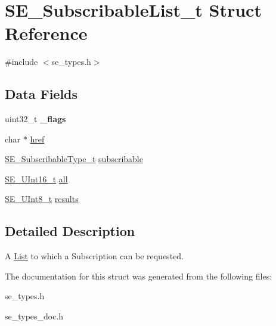 \hypertarget{structSE__SubscribableList__t}{}\section{S\+E\+\_\+\+Subscribable\+List\+\_\+t Struct Reference}
\label{structSE__SubscribableList__t}


{\ttfamily \#include $<$se\+\_\+types.\+h$>$}

\subsection*{Data Fields}
\begin{DoxyCompactItemize}
\item 
uint32\+\_\+t {\bfseries \+\_\+flags}
\item 
char $\ast$ \hyperlink{group__SubscribableList_gae6a8fd9999ba1d8525cd868cb088ea31}{href}
\item 
\hyperlink{group__SubscribableType_ga5c41f553d369710ed34619266bf2551e}{S\+E\+\_\+\+Subscribable\+Type\+\_\+t} \hyperlink{group__SubscribableList_ga3d4a74396a374cf43daaa4fde3f4d4ca}{subscribable}
\item 
\hyperlink{group__UInt16_gac68d541f189538bfd30cfaa712d20d29}{S\+E\+\_\+\+U\+Int16\+\_\+t} \hyperlink{group__SubscribableList_ga7df2805aa87bcfea953995fcf448a13c}{all}
\item 
\hyperlink{group__UInt8_gaf7c365a1acfe204e3a67c16ed44572f5}{S\+E\+\_\+\+U\+Int8\+\_\+t} \hyperlink{group__SubscribableList_ga188bf230efbba4b5cc5b73b8f2ee68b4}{results}
\end{DoxyCompactItemize}


\subsection{Detailed Description}
A \hyperlink{structList}{List} to which a Subscription can be requested. 

The documentation for this struct was generated from the following files\+:\begin{DoxyCompactItemize}
\item 
se\+\_\+types.\+h\item 
se\+\_\+types\+\_\+doc.\+h\end{DoxyCompactItemize}
